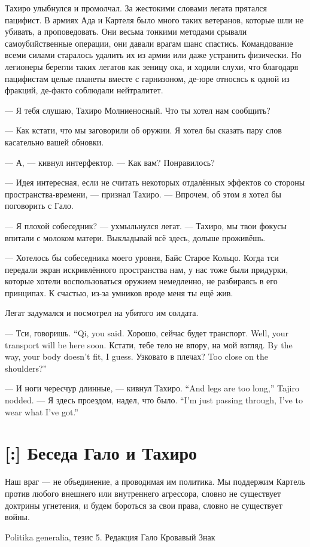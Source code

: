 Тахиро улыбнулся и промолчал.
За жестокими словами легата прятался пацифист.
В армиях Ада и Картеля было много таких ветеранов, которые шли не убивать, а проповедовать.
Они весьма тонкими методами срывали самоубийственные операции, они давали врагам шанс спастись.
Командование всеми силами старалось удалить их из армии или даже устранить физически.
Но легионеры берегли таких легатов как зеницу ока, и ходили слухи, что благодаря пацифистам целые планеты вместе с гарнизоном, де-юре относясь к одной из фракций, де-факто соблюдали нейтралитет.

--- Я тебя слушаю, Тахиро Молниеносный.
Что ты хотел нам сообщить?

--- Как кстати, что мы заговорили об оружии.
Я хотел бы сказать пару слов касательно вашей обновки.

--- А, --- кивнул интерфектор.
--- Как вам?
Понравилось?

--- Идея интересная, если не считать некоторых отдалённых эффектов со стороны пространства-времени, --- признал Тахиро.
--- Впрочем, об этом я хотел бы поговорить с Гало.

--- Я плохой собеседник? --- ухмыльнулся легат.
--- Тахиро, мы твои фокусы впитали с молоком матери.
Выкладывай всё здесь, дольше проживёшь.

--- Хотелось бы собеседника моего уровня, Байс Старое Кольцо.
Когда тси передали экран искривлённого пространства нам, у нас тоже были придурки, которые хотели воспользоваться оружием немедленно, не разбираясь в его принципах.
К счастью, из-за умников вроде меня ты ещё жив.

Легат задумался и посмотрел на убитого им солдата.

{--- Тси, говоришь.}
{``Qi, you said.}
{Хорошо, сейчас будет транспорт.}
{Well, your transport will be here soon.}
{Кстати, тебе тело не впору, на мой взгляд.}
{By the way, your body doesn't fit, I guess.}
{Узковато в плечах?}
{Too close on the shoulders?''}

{--- И ноги чересчур длинные, --- кивнул Тахиро.}
{``And legs are too long,'' Tajiro nodded.}
{--- Я здесь проездом, надел, что было.}
{``I'm just passing through, I've to wear what I've got.''}

\section{[:] Беседа Гало и Тахиро}

\epigraph
{Наш враг --- не объединение, а проводимая им политика.
Мы поддержим Картель против любого внешнего или внутреннего агрессора, словно не существует доктрины угнетения, и будем бороться за свои права, словно не существует войны.}
{Politika generalia, тезис 5.
Редакция Гало Кровавый Знак}

